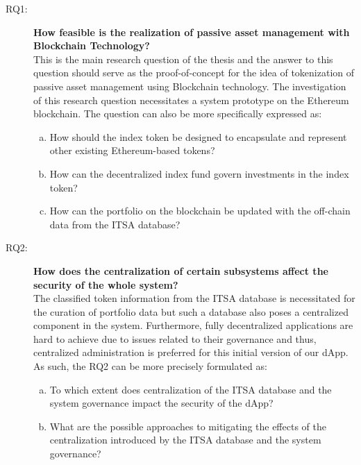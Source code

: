 \begin{description}
    \item[RQ1:] \textbf{How feasible is the realization of passive asset management with Blockchain Technology?}\\
    This is the main research question of the thesis and the answer to this question should serve as the proof-of-concept for the idea of tokenization of passive asset management using Blockchain technology. The investigation of this research question necessitates a system prototype on the Ethereum blockchain. The question can also be more specifically expressed as:
    \begin{enumerate}[(a)]
        \item How should the index token be designed to encapsulate and represent other existing Ethereum-based tokens?
        \item How can the decentralized index fund govern investments in the index token?
        \item How can the portfolio on the blockchain be updated with the off-chain data from the ITSA database?
    \end{enumerate}
    
    
    \item[RQ2:] \textbf{How does the centralization of certain subsystems affect the security of the whole system?}\\
    The classified token information from the ITSA database is necessitated for the curation of portfolio data but such a database also poses a centralized component in the system. Furthermore, fully decentralized applications are hard to achieve due to issues related to their governance and thus, centralized administration is preferred for this initial version of our dApp. As such, the RQ2 can be more precisely formulated as:
    \begin{enumerate}[(a)]
        \item To which extent does centralization of the ITSA database and the system governance impact the security of the dApp?
        
        \item What are the possible approaches to mitigating the effects of the centralization introduced by the ITSA database and the system governance?
    \end{enumerate}
    
    
    
\end{description}






